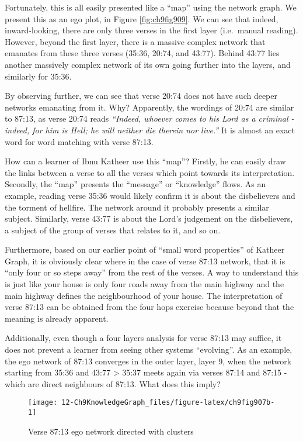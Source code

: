 \documentclass[
]{article}
\begin{document}
Fortunately, this is all easily presented like a ``map'' using the network graph. We present this as an ego plot, in Figure \ref{fig:ch9fig909}. We can see that indeed, inward-looking, there are only three verses in the first layer (i.e.~manual reading). However, beyond the first layer, there is a massive complex network that emanates from these three verses (35:36, 20:74, and 43:77). Behind 43:77 lies another massively complex network of its own going further into the layers, and similarly for 35:36.

By observing further, we can see that verse 20:74 does not have such deeper networks emanating from it. Why? Apparently, the wordings of 20:74 are similar to 87:13, as verse 20:74 reads \emph{``Indeed, whoever comes to his Lord as a criminal - indeed, for him is Hell; he will neither die therein nor live.''} It is almost an exact word for word matching with verse 87:13.

How can a learner of Ibnu Katheer use this ``map''? Firstly, he can easily draw the links between a verse to all the verses which point towards its interpretation. Secondly, the ``map'' presents the ``message'' or ``knowledge'' flows. As an example, reading verse 35:36 would likely confirm it is about the disbelievers and the torment of hellfire. The network around it probably presents a similar subject. Similarly, verse 43:77 is about the Lord's judgement on the disbelievers, a subject of the group of verses that relates to it, and so on.

Furthermore, based on our earlier point of ``small word properties'' of Katheer Graph, it is obviously clear where in the case of verse 87:13 network, that it is ``only four or so steps away'' from the rest of the verses. A way to understand this is just like your house is only four roads away from the main highway and the main highway defines the neighbourhood of your house. The interpretation of verse 87:13 can be obtained from the four hops exercise because beyond that the meaning is already apparent.

Additionally, even though a four layers analysis for verse 87:13 may suffice, it does not prevent a learner from seeing other systems ``evolving''. As an example, the ego network of 87:13 converges in the outer layer, layer 9, when the network starting from 35:36 and 43:77 \textgreater{} 35:37 meets again via verses 87:14 and 87:15 - which are direct neighbours of 87:13. What does this imply?

\begin{figure}

{\centering \texttt{[image: 12-Ch9KnowledgeGraph\_files/figure-latex/ch9fig907b-1]} 

}

\caption{Verse 87:13 ego network directed with clusters}\label{fig:ch9fig907b}
\end{figure}
\end{document}

